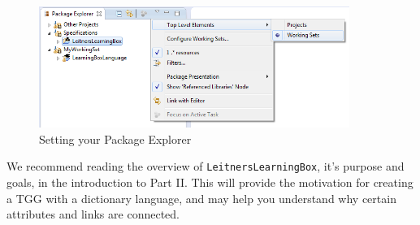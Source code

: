 \begin{itemize}
\vspace{0.5cm}

\begin{figure}[htbp]
	\centering
  \includegraphics[width=0.9\textwidth]{eclipse_workingSets}
	\caption{Setting your Package Explorer}
	\label{fig:workingSets}
\end{figure}

We recommend reading the overview of \texttt{LeitnersLearningBox}, it's purpose and goals, in the introduction to Part II. This will provide the
motivation for creating a TGG with a dictionary language, and may help you understand why certain attributes and links are connected.

\end{itemize}




